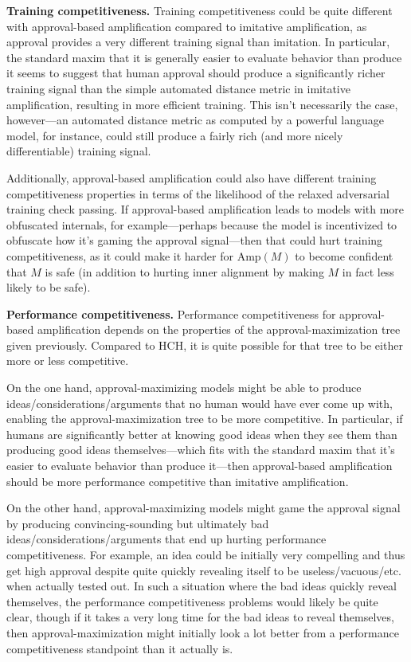 \documentclass[
  onecolumn,
  natbib,
]{miri-tech-article}
\begin{document}
\textbf{Training competitiveness.} Training competitiveness could be quite different with approval-based amplification compared to imitative amplification, as approval provides a very different training signal than imitation. In particular, the standard maxim that it is generally easier to evaluate behavior than produce it seems to suggest that human approval should produce a significantly richer training signal than the simple automated distance metric in imitative amplification, resulting in more efficient training. This isn't necessarily the case, however---an automated distance metric as computed by a powerful language model, for instance, could still produce a fairly rich (and more nicely differentiable) training signal.

Additionally, approval-based amplification could also have different training competitiveness properties in terms of the likelihood of the relaxed adversarial training check passing. If approval-based amplification leads to models with more obfuscated internals, for example---perhaps because the model is incentivized to obfuscate how it's gaming the approval signal---then that could hurt training competitiveness, as it could make it harder for $\text{Amp}(M)$ to become confident that $M$ is safe (in addition to hurting inner alignment by making $M$ in fact less likely to be safe).

\textbf{Performance competitiveness.} Performance competitiveness for approval-based amplification depends on the properties of the approval-maximization tree given previously. Compared to HCH, it is quite possible for that tree to be either more or less competitive.

On the one hand, approval-maximizing models might be able to produce ideas/considerations/arguments that no human would have ever come up with, enabling the approval-maximization tree to be more competitive. In particular, if humans are significantly better at knowing good ideas when they see them than producing good ideas themselves---which fits with the standard maxim that it's easier to evaluate behavior than produce it---then approval-based amplification should be more performance competitive than imitative amplification.

On the other hand, approval-maximizing models might game the approval signal by producing convincing-sounding but ultimately bad ideas/considerations/arguments that end up hurting performance competitiveness. For example, an idea could be initially very compelling and thus get high approval despite quite quickly revealing itself to be useless/vacuous/etc. when actually tested out. In such a situation where the bad ideas quickly reveal themselves, the performance competitiveness problems would likely be quite clear, though if it takes a very long time for the bad ideas to reveal themselves, then approval-maximization might initially look a lot better from a performance competitiveness standpoint than it actually is.
\end{document}
